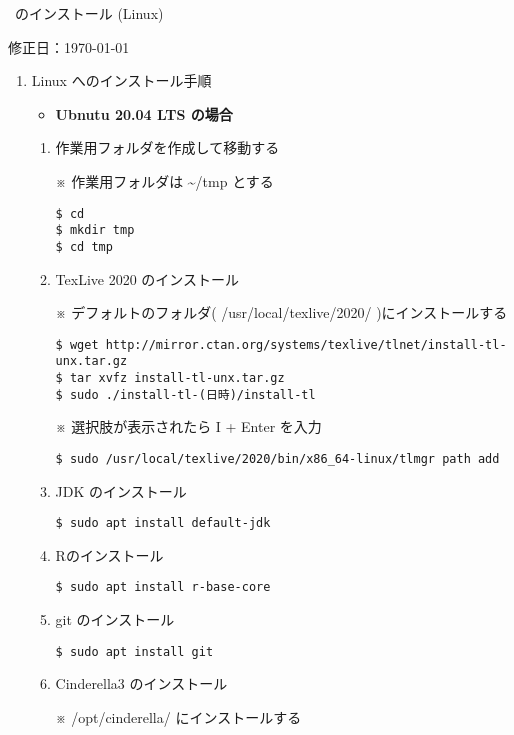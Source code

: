 \documentclass{ujarticle}
\begin{document}
\begin{center}
\ketcindy\ のインストール (Linux)
\end{center}

\hfill 修正日：\today

\begin{enumerate}[\bf\large 1.]
\item Linux へのインストール手順

\begin{itemize}
\item {\bf Ubnutu 20.04 LTS の場合}
\end{itemize}

\begin{enumerate}[(1)]

\item 作業用フォルダを作成して移動する

※ 作業用フォルダは \textasciitilde/tmp とする

\begin{verbatim}
$ cd
$ mkdir tmp
$ cd tmp
\end{verbatim}

\item TexLive 2020 のインストール

※ デフォルトのフォルダ( /usr/local/texlive/2020/ )にインストールする

\begin{verbatim}
$ wget http://mirror.ctan.org/systems/texlive/tlnet/install-tl-unx.tar.gz
$ tar xvfz install-tl-unx.tar.gz
$ sudo ./install-tl-(日時)/install-tl
\end{verbatim}

※ 選択肢が表示されたら I + Enter を入力

\verb|$ sudo /usr/local/texlive/2020/bin/x86_64-linux/tlmgr path add|

\item JDK のインストール

\verb|$ sudo apt install default-jdk|

\item Rのインストール

\verb|$ sudo apt install r-base-core|

\item git のインストール

\verb|$ sudo apt install git|

\item Cinderella3 のインストール

※ /opt/cinderella/ にインストールする


\end{enumerate}
\end{enumerate}
\end{document}
